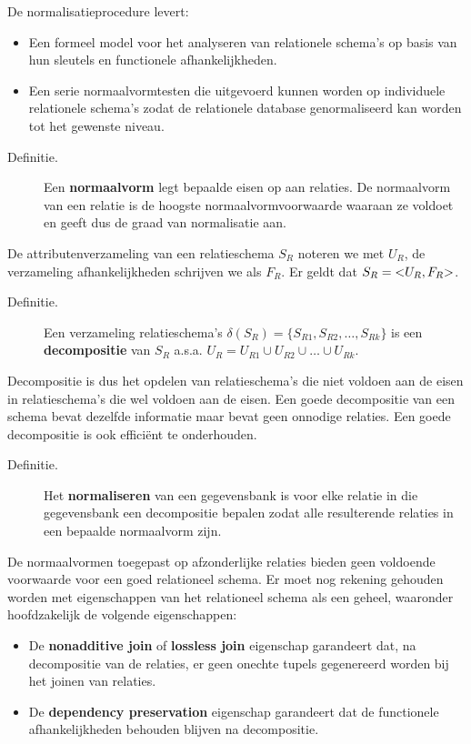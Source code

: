 De normalisatieprocedure levert:
\begin{itemize}
	\item Een formeel model voor het analyseren van relationele schema's op basis van hun sleutels en functionele afhankelijkheden.
	\item Een serie normaalvormtesten die uitgevoerd kunnen worden op individuele relationele schema's zodat de relationele database genormaliseerd kan worden tot het gewenste niveau.
\end{itemize}
\begin{description}
	\item[Definitie.] Een \textbf{normaalvorm} legt bepaalde eisen op aan relaties. De normaalvorm van een relatie is de hoogste normaalvormvoorwaarde waaraan ze voldoet en geeft dus de graad van normalisatie aan.
\end{description}
De attributenverzameling van een relatieschema $S_R$ noteren we met $U_R$, de verzameling afhankelijkheden schrijven we als $F_R$.	Er geldt dat $S_R = \text{\textless} U_R , F_R \text{\textgreater}$.
\begin{description}
	\item[Definitie.] Een verzameling relatieschema's $\delta(S_R) = \{S_{R1}, S_{R2}, \dots, S_{Rk}\}$ is een \textbf{decompositie} van $S_R$ a.s.a. $U_R = U_{R1} \cup U_{R2} \cup \dots \cup U_{Rk}$.
\end{description}
Decompositie is dus het opdelen van relatieschema's die niet voldoen aan de eisen in relatieschema's die wel voldoen aan de eisen. Een goede decompositie van een schema bevat dezelfde informatie maar bevat geen onnodige relaties. Een goede decompositie is ook effici\"ent te onderhouden.
\begin{description}
	\item[Definitie.] Het \textbf{normaliseren} van een gegevensbank is voor elke relatie in die gegevensbank een decompositie bepalen zodat alle resulterende relaties in een bepaalde normaalvorm zijn.
\end{description}
De normaalvormen toegepast op afzonderlijke relaties bieden geen voldoende voorwaarde voor een goed relationeel schema. Er moet nog rekening gehouden worden met eigenschappen van het relationeel schema als een geheel, waaronder hoofdzakelijk de volgende eigenschappen: 
\begin{itemize}
	\item De \textbf{nonadditive join} of \textbf{lossless join} eigenschap garandeert dat, na decompositie van de relaties, er geen onechte tupels gegenereerd worden bij het joinen van relaties.
	\item De \textbf{dependency preservation} eigenschap garandeert dat de functionele afhankelijkheden behouden blijven na decompositie.
\end{itemize}


